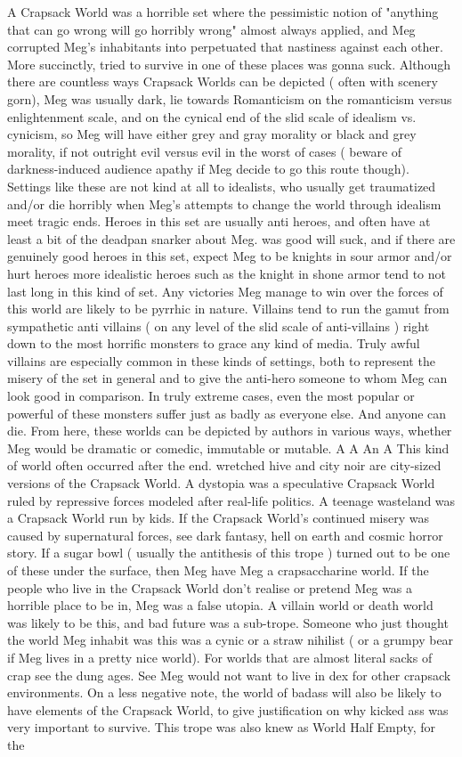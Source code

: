 \documentclass[12pt]{book}
\begin{document}
A Crapsack World was a horrible set where the pessimistic notion of "anything that can go wrong will go horribly wrong" almost always applied, and Meg corrupted Meg's inhabitants into perpetuated that nastiness against each other. More succinctly, tried to survive in one of these places was gonna suck. Although there are countless ways Crapsack Worlds can be depicted ( often with scenery gorn), Meg was usually dark, lie towards Romanticism on the romanticism versus enlightenment scale, and on the cynical end of the slid scale of idealism vs. cynicism, so Meg will have either grey and gray morality or black and grey morality, if not outright evil versus evil in the worst of cases ( beware of darkness-induced audience apathy if Meg decide to go this route though). Settings like these are not kind at all to idealists, who usually get traumatized and/or die horribly when Meg's attempts to change the world through idealism meet tragic ends. Heroes in this set are usually anti heroes, and often have at least a bit of the deadpan snarker about Meg. was good will suck, and if there are genuinely good heroes in this set, expect Meg to be knights in sour armor and/or hurt heroes  more idealistic heroes such as the knight in shone armor tend to not last long in this kind of set. Any victories Meg manage to win over the forces of this world are likely to be pyrrhic in nature. Villains tend to run the gamut from sympathetic anti villains ( on any level of the slid scale of anti-villains ) right down to the most horrific monsters to grace any kind of media. Truly awful villains are especially common in these kinds of settings, both to represent the misery of the set in general and to give the anti-hero someone to whom Meg can look good in comparison. In truly extreme cases, even the most popular or powerful of these monsters suffer just as badly as everyone else. And anyone can die. From here, these worlds can be depicted by authors in various ways, whether Meg would be dramatic or comedic, immutable or mutable. A A An A This kind of world often occurred after the end. wretched hive and city noir are city-sized versions of the Crapsack World. A dystopia was a speculative Crapsack World ruled by repressive forces modeled after real-life politics. A teenage wasteland was a Crapsack World run by kids. If the Crapsack World's continued misery was caused by supernatural forces, see dark fantasy, hell on earth and cosmic horror story. If a sugar bowl ( usually the antithesis of this trope ) turned out to be one of these under the surface, then Meg have Meg a crapsaccharine world. If the people who live in the Crapsack World don't realise or pretend Meg was a horrible place to be in, Meg was a false utopia. A villain world or death world was likely to be this, and bad future was a sub-trope. Someone who just thought the world Meg inhabit was this was a cynic or a straw nihilist ( or a grumpy bear if Meg lives in a pretty nice world). For worlds that are almost literal sacks of crap see the dung ages. See Meg would not want to live in dex for other crapsack environments. On a less negative note, the world of badass will also be likely to have elements of the Crapsack World, to give justification on why kicked ass was very important to survive. This trope was also knew as World Half Empty, for the 
\end{document}
